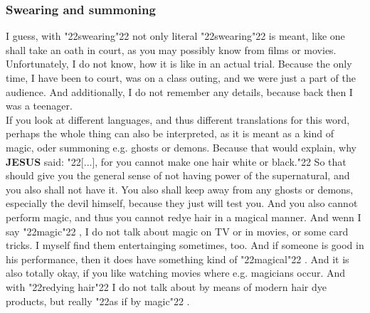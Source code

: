 \documentclass[10pt,a5paper]{article}
\newcommand{\Jesus}[0]{\textbf{JESUS}}
\newcommand{\q}[1]{\char"22{#1}\char"22 }
\begin{document}
	\subsubsection{Swearing and summoning}
		I guess,
		with \q{swearing} not only literal \q{swearing} is meant,
		like one shall take an oath in court,
		as you may possibly know from films or movies.
		Unfortunately,
		I do not know,
		how it is like in an actual trial.
		Because the only time,
		I have been to court,
		was on a class outing,
		and we were just a part of the audience.
		And additionally,
		I do not remember any details,
		because back then I was a teenager.
		\\
		If you look at different languages,
		and thus different translations for this word,
		perhaps the whole thing can also be interpreted,
		as it is meant as a kind of magic,
		oder summoning e.g. ghosts or demons.
		Because that would explain,
		why {\Jesus} said:
		\q{[...],
		for you cannot make one hair white or black.}
		So that should give you the general sense of not having power of the supernatural,
		and you also shall not have it.
		You also shall keep away from any ghosts or demons,
		especially the devil himself,
		because they just will test you.
		And you also cannot perform magic,
		and thus you cannot redye hair in a magical manner.
		And wenn I say \q{magic},
		I do not talk about magic on TV or in movies,
		or some card tricks.
		I myself find them entertainging sometimes, too.
		And if someone is good in his performance,
		then it does have something kind of \q{magical}.
		And it is also totally okay,
		if you like watching movies where e.g. magicians occur.
		And with \q{redying hair} I do not talk about by means of modern hair dye products,
		but really \q{as if by magic}.
\end{document}
